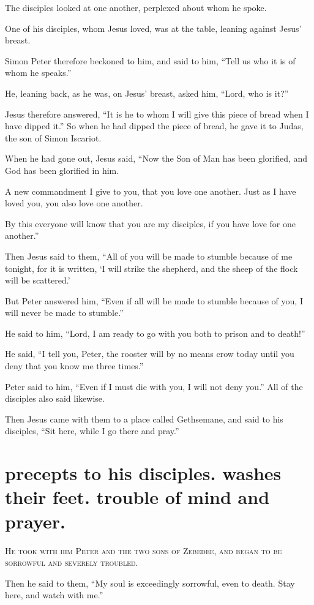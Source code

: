 The disciples looked at one another, perplexed about whom he spoke.

One of his disciples, whom Jesus loved, was at the table, leaning against Jesus’ breast.

Simon Peter therefore beckoned to him, and said to him, “Tell us who it is of whom he speaks.”

He, leaning back, as he was, on Jesus’ breast, asked him, “Lord, who is it?”

Jesus therefore answered, “It is he to whom I will give this piece of bread when I have dipped it.” So when he had dipped the piece of bread, he gave it to Judas, the son of Simon Iscariot.

When he had gone out, Jesus said, “Now the Son of Man has been glorified, and God has been glorified in him.

A new commandment I give to you, that you love one another. Just as I have loved you, you also love one another.

By this everyone will know that you are my disciples, if you have love for one another.”

Then Jesus said to them, “All of you will be made to stumble because of me tonight, for it is written, ‘I will strike the shepherd, and the sheep of the flock will be scattered.’

But Peter answered him, “Even if all will be made to stumble because of you, I will never be made to stumble.”

He said to him, “Lord, I am ready to go with you both to prison and to death!”

He said, “I tell you, Peter, the rooster will by no means crow today until you deny that you know me three times.”

Peter said to him, “Even if I must die with you, I will not deny you.” All of the disciples also said likewise.

Then Jesus came with them to a place called Gethsemane, and said to his disciples, “Sit here, while I go there and pray.”


\clearpage \section*{precepts to his disciples. washes their feet. trouble of mind and prayer.}

\lettrine{H}{e took with him Peter and the two sons of Zebedee, and began to be sorrowful and severely troubled.}

Then he said to them, “My soul is exceedingly sorrowful, even to death. Stay here, and watch with me.”

